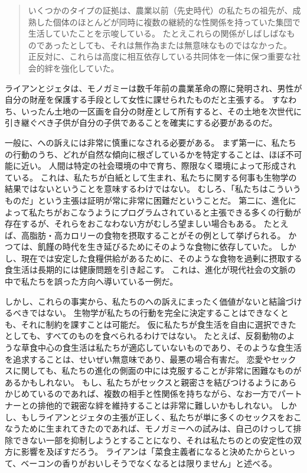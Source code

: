 \documentclass[paper=a4,book,openany]{jlreq} \usepackage{mystyle}
\begin{document}
\begin{quote}

いくつかのタイプの証拠は、農業以前（先史時代）の私たちの祖先が、成熟した個体のほとんどが同時に複数の継続的な性関係を持っていた集団で生活していたことを示唆している。
たとえこれらの関係がしばしばなものであったとしても、それは無作為または無意味なものではなかった。
正反対に、これらは高度に相互依存している共同体を一体に保つ重要な社会的絆を強化していた。
\citep[pp.9--10]{ryan10:_sex_dawn}
\end{quote}

ライアンとジェタは、モノガミーは数千年前の農業革命の際に発明され、男性が自分の財産を保護する手段として女性に課せられたものだと主張する。
すなわち、いったん土地の一区画を自分の財産として所有すると、その土地を次世代に引き継ぐべき子供が自分の子供であることを確実にする必要があるのだ。

一般に、への訴えには非常に慎重になされる必要がある。
まず第一に、私たちの行動のうち、どれが自然な傾向に根ざしているかを特定することは、ほぼ不可能に近い。
人間は特定の社会環境の中で育ち、際限なく環境によって形成されている。
これは、私たちが白紙として生まれ、私たちに関する何事も生物学の結果ではないということを意味するわけではない。
むしろ、「私たちはこういうものだ」という主張は証明が常に非常に困難だということだ。
第二に、進化によって私たちがおこなうようにプログラムされていると主張できる多くの行動が存在するが、それらをおこなわない方がむしろ望ましい場合もある。
たとえば、高脂肪・高カロリーの食物を摂取することがその例として挙げられる。
かつては、飢饉の時代を生き延びるためにそのような食物に依存していた。
しかし、現在では安定した食糧供給があるために、そのような食物を過剰に摂取する食生活は長期的には健康問題を引き起こす。
これは、進化が現代社会の文脈の中で私たちを誤った方向へ導いている一例だ。

しかし、これらの事実から、私たちのへの訴えにまったく価値がないと結論づけるべきではない。
生物学が私たちの行動を完全に決定することはできなくとも、それに制約を課すことは可能だ。
仮に私たちが食生活を自由に選択できたとしても、すべてのものを食べられるわけではない。
たとえば、反芻動物のような草食中心の食生活は私たちが適応していないものであり、そのような食生活を追求することは、せいぜい無意味であり、最悪の場合有害だ。
恋愛やセックスに関しても、私たちの進化の側面の中には克服することが非常に困難なものがあるかもしれない。
もし、私たちがセックスと親密さを結びつけるようにあらかじめているのであれば、複数の相手と性関係を持ちながら、なお一方でパートナーとの排他的で親密な絆を維持することは非常に難しいかもしれない。
しかし、もしライアンとジェタの主張が正しく、私たちが単に多くのセックスをおこなうために生まれてきたのであれば、モノガミーへの試みは、自己のけっして排除できない一部を抑制しようとすることになり、それは私たちのとの安定性の双方に影響を及ぼすだろう。
ライアンは「菜食主義者になると決めたからといって、ベーコンの香りがおいしそうでなくなるとは限りません」と述べる\citep{bishop10:_ask_chris_ryan_ph}。
\end{document}
